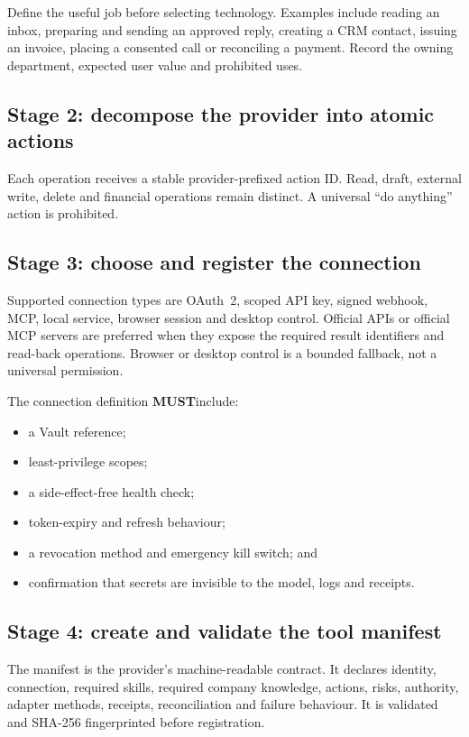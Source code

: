 \documentclass[11pt,a4paper]{article}
\newcommand{\must}{\textbf{MUST}}
\begin{document}
Define the useful job before selecting technology. Examples include reading an
inbox, preparing and sending an approved reply, creating a CRM contact, issuing
an invoice, placing a consented call or reconciling a payment. Record the owning
department, expected user value and prohibited uses.

\subsection{Stage 2: decompose the provider into atomic actions}

Each operation receives a stable provider-prefixed action ID. Read, draft,
external write, delete and financial operations remain distinct. A universal
``do anything'' action is prohibited.

\subsection{Stage 3: choose and register the connection}

Supported connection types are OAuth~2, scoped API key, signed webhook, MCP,
local service, browser session and desktop control. Official APIs or official
MCP servers are preferred when they expose the required result identifiers and
read-back operations. Browser or desktop control is a bounded fallback, not a
universal permission.

The connection definition \must include:

\begin{itemize}
  \item a Vault reference;
  \item least-privilege scopes;
  \item a side-effect-free health check;
  \item token-expiry and refresh behaviour;
  \item a revocation method and emergency kill switch; and
  \item confirmation that secrets are invisible to the model, logs and receipts.
\end{itemize}

\subsection{Stage 4: create and validate the tool manifest}

The manifest is the provider's machine-readable contract. It declares identity,
connection, required skills, required company knowledge, actions, risks,
authority, adapter methods, receipts, reconciliation and failure behaviour. It
is validated and SHA-256 fingerprinted before registration.
\end{document}
